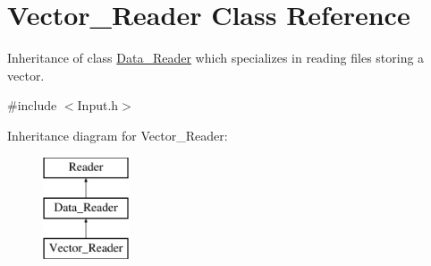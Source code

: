\hypertarget{class_vector___reader}{}\section{Vector\+\_\+\+Reader Class Reference}
\label{class_vector___reader}


Inheritance of class \mbox{\hyperlink{class_data___reader}{Data\+\_\+\+Reader}} which specializes in reading files storing a vector.  




{\ttfamily \#include $<$Input.\+h$>$}

Inheritance diagram for Vector\+\_\+\+Reader\+:\begin{figure}[H]
\begin{center}
\leavevmode
\includegraphics[height=3.000000cm]{class_vector___reader}
\end{center}
\end{figure}
